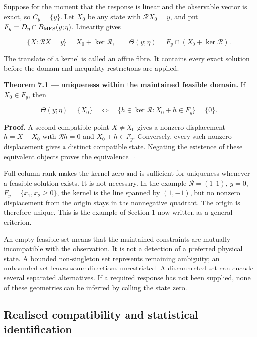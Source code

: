 \documentclass[
  11pt,
  a4paper]{article}
\begin{document}
Suppose for the moment that the response is linear and the observable vector is exact, so \(C_y=\{y\}\). Let \(X_0\) be any state with \(\mathcal R X_0=y\), and put \(F_y=D_\eta\cap B_{\rm MES}(y;\eta)\). Linearity gives

\[
\{X:\mathcal RX=y\}=X_0+\ker\mathcal R,
\qquad
\Theta(y;\eta)=F_y\cap(X_0+\ker\mathcal R).
\tag{7.2}
\]

The translate of a kernel is called an affine fibre. It contains every exact solution before the domain and inequality restrictions are applied.

\textbf{Theorem 7.1 --- uniqueness within the maintained feasible domain.} If \(X_0\in F_y\), then

\[
\Theta(y;\eta)=\{X_0\}
\quad\Longleftrightarrow\quad
\{h\in\ker\mathcal R:X_0+h\in F_y\}=\{0\}.
\tag{7.3}
\]

\textbf{Proof.} A second compatible point \(X\ne X_0\) gives a nonzero displacement \(h=X-X_0\) with \(\mathcal Rh=0\) and \(X_0+h\in F_y\). Conversely, every such nonzero displacement gives a distinct compatible state. Negating the existence of these equivalent objects proves the equivalence. \(\square\)

Full column rank makes the kernel zero and is sufficient for uniqueness whenever a feasible solution exists. It is not necessary. In the example \(\mathcal R=(1\ \ 1)\), \(y=0\), \(F_y=\{x_1,x_2\ge0\}\), the kernel is the line spanned by \((1,-1)\), but no nonzero displacement from the origin stays in the nonnegative quadrant. The origin is therefore unique. This is the example of Section 1 now written as a general criterion.

An empty feasible set means that the maintained constraints are mutually incompatible with the observation. It is not a detection of a preferred physical state. A bounded non-singleton set represents remaining ambiguity; an unbounded set leaves some directions unrestricted. A disconnected set can encode several separated alternatives. If a required response has not been supplied, none of these geometries can be inferred by calling the state zero.

\hypertarget{realised-compatibility-and-statistical-identification}{%
\subsection{Realised compatibility and statistical identification}\label{realised-compatibility-and-statistical-identification}}
\end{document}
